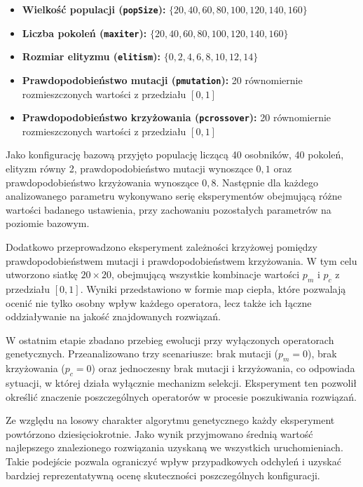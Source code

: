 \documentclass[a4paper,12pt]{article}
\begin{document}
\begin{itemize}
    \item \textbf{Wielkość populacji (\texttt{popSize}):} $\{20, 40, 60, 80, 100, 120, 140, 160\}$
    \item \textbf{Liczba pokoleń (\texttt{maxiter}):} $\{20, 40, 60, 80, 100, 120, 140, 160\}$
    \item \textbf{Rozmiar elityzmu (\texttt{elitism}):} $\{0, 2, 4, 6, 8, 10, 12, 14\}$
    \item \textbf{Prawdopodobieństwo mutacji (\texttt{pmutation}):} 20 równomiernie rozmieszczonych wartości z przedziału $[0, 1]$
    \item \textbf{Prawdopodobieństwo krzyżowania (\texttt{pcrossover}):} 20 równomiernie rozmieszczonych wartości z przedziału $[0, 1]$
\end{itemize}

Jako konfigurację bazową przyjęto populację liczącą 40 osobników, 40 pokoleń, elityzm równy 2, prawdopodobieństwo mutacji wynoszące $0{,}1$ oraz prawdopodobieństwo krzyżowania wynoszące $0{,}8$. Następnie dla każdego analizowanego parametru wykonywano serię eksperymentów obejmującą różne wartości badanego ustawienia, przy zachowaniu pozostałych parametrów na poziomie bazowym.

Dodatkowo przeprowadzono eksperyment zależności krzyżowej pomiędzy prawdopodobieństwem mutacji i prawdopodobieństwem krzyżowania. W tym celu utworzono siatkę $20 \times 20$, obejmującą wszystkie kombinacje wartości $p_m$ i $p_c$ z przedziału $[0, 1]$. Wyniki przedstawiono w formie map ciepła, które pozwalają ocenić nie tylko osobny wpływ każdego operatora, lecz także ich łączne oddziaływanie na jakość znajdowanych rozwiązań.

W ostatnim etapie zbadano przebieg ewolucji przy wyłączonych operatorach genetycznych. Przeanalizowano trzy scenariusze: brak mutacji ($p_m = 0$), brak krzyżowania ($p_c = 0$) oraz jednoczesny brak mutacji i krzyżowania, co odpowiada sytuacji, w której działa wyłącznie mechanizm selekcji. Eksperyment ten pozwolił określić znaczenie poszczególnych operatorów w procesie poszukiwania rozwiązań.

Ze względu na losowy charakter algorytmu genetycznego każdy eksperyment powtórzono dziesięciokrotnie. Jako wynik przyjmowano średnią wartość najlepszego znalezionego rozwiązania uzyskaną we wszystkich uruchomieniach. Takie podejście pozwala ograniczyć wpływ przypadkowych odchyleń i uzyskać bardziej reprezentatywną ocenę skuteczności poszczególnych konfiguracji.
\end{document}

